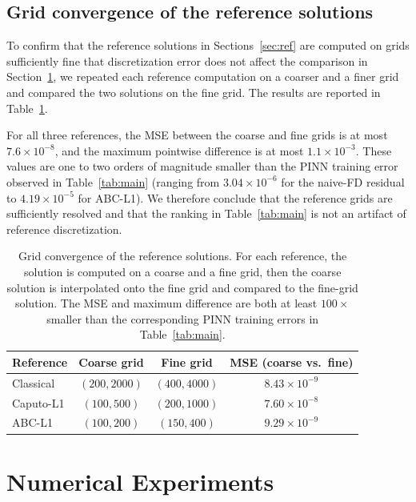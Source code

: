 \documentclass[11pt]{article}
\begin{document}
\subsection{Grid convergence of the reference solutions}
\label{sec:grid_convergence}

To confirm that the reference solutions in Sections~\ref{sec:ref}
are computed on grids sufficiently fine that discretization error does
not affect the comparison in Section~\ref{sec:results}, we repeated
each reference computation on a coarser and a finer grid and compared
the two solutions on the fine grid. The results are reported in
Table~\ref{tab:grid_convergence}.

For all three references, the MSE between the coarse and fine grids
is at most \(7.6\times 10^{-8}\), and the maximum pointwise difference
is at most \(1.1\times 10^{-3}\). These values are one to two orders
of magnitude smaller than the PINN training error observed in
Table~\ref{tab:main} (ranging from \(3.04\times 10^{-6}\) for the
naive-FD residual to \(4.19\times 10^{-5}\) for ABC-L1). We therefore
conclude that the reference grids are sufficiently resolved and that
the ranking in Table~\ref{tab:main} is not an artifact of reference
discretization.

\begin{table}[h]
\centering
\caption{Grid convergence of the reference solutions. For each
         reference, the solution is computed on a coarse and a fine
         grid, then the coarse solution is interpolated onto the fine
         grid and compared to the fine-grid solution. The MSE and
         maximum difference are both at least \(100\times\) smaller
         than the corresponding PINN training errors in
         Table~\ref{tab:main}.}
\label{tab:grid_convergence}
\begin{tabular}{lccc}
\toprule
Reference & Coarse grid & Fine grid & MSE (coarse vs.\ fine) \\
\midrule
Classical & \((200, 2000)\) & \((400, 4000)\) & \(8.43\times 10^{-9}\) \\
Caputo-L1 & \((100, 500)\)  & \((200, 1000)\) & \(7.60\times 10^{-8}\) \\
ABC-L1    & \((100, 200)\)  & \((150, 400)\)  & \(9.29\times 10^{-9}\) \\
\bottomrule
\end{tabular}
\end{table}

\section{Numerical Experiments}
\label{sec:results}
\end{document}
